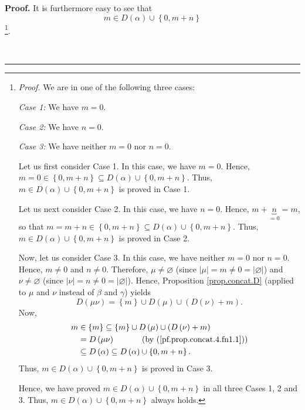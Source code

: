 \documentclass[numbers=enddot,12pt,final,onecolumn,notitlepage]{scrartcl}%
\theoremstyle{definition}
\newenvironment{proof}[1][Proof]{\noindent\textbf{#1.} }{\ \rule{0.5em}{0.5em}}
\begin{document}
\begin{proof}
It is furthermore easy to see that%
\[
m\in D\left(  \alpha\right)  \cup\left\{  0,m+n\right\}
\]
\footnote{\textit{Proof.} We are in one of the following three cases:
\par
\textit{Case 1:} We have $m=0$.
\par
\textit{Case 2:} We have $n=0$.
\par
\textit{Case 3:} We have neither $m=0$ nor $n=0$.
\par
Let us first consider Case 1. In this case, we have $m=0$. Hence,
$m=0\in\left\{  0,m+n\right\}  \subseteq D\left(  \alpha\right)  \cup\left\{
0,m+n\right\}  $. Thus, $m\in D\left(  \alpha\right)  \cup\left\{
0,m+n\right\}  $ is proved in Case 1.
\par
Let us next consider Case 2. In this case, we have $n=0$. Hence,
$m+\underbrace{n}_{=0}=m$, so that $m=m+n\in\left\{  0,m+n\right\}  \subseteq
D\left(  \alpha\right)  \cup\left\{  0,m+n\right\}  $. Thus, $m\in D\left(
\alpha\right)  \cup\left\{  0,m+n\right\}  $ is proved in Case 2.
\par
Now, let us consider Case 3. In this case, we have neither $m=0$ nor $n=0$.
Hence, $m\neq0$ and $n\neq0$. Therefore, $\mu\neq\varnothing$ (since
$\left\vert \mu\right\vert =m\neq0=\left\vert \varnothing\right\vert $) and
$\nu\neq\varnothing$ (since $\left\vert \nu\right\vert =n\neq0=\left\vert
\varnothing\right\vert $). Hence, Proposition \ref{prop.concat.D} (applied to
$\mu$ and $\nu$ instead of $\beta$ and $\gamma$) yields%
\begin{equation}
D\left(  \mu\nu\right)  =\left\{  m\right\}  \cup D\left(  \mu\right)
\cup\left(  D\left(  \nu\right)  +m\right)  . \label{pf.prop.concat.4.fn1.1}%
\end{equation}
Now,
\begin{align*}
m  &  \in\left\{  m\right\}  \subseteq\left\{  m\right\}  \cup D\left(
\mu\right)  \cup\left(  D\left(  \nu\right)  +m\right) \\
&  =D\left(  \mu\nu\right)  \ \ \ \ \ \ \ \ \ \ \left(  \text{by
(\ref{pf.prop.concat.4.fn1.1})}\right) \\
&  \subseteq D\left(  \alpha\right)  \subseteq D\left(  \alpha\right)
\cup\left\{  0,m+n\right\}  .
\end{align*}
Thus, $m\in D\left(  \alpha\right)  \cup\left\{  0,m+n\right\}  $ is proved in
Case 3.
\par
Hence, we have proved $m\in D\left(  \alpha\right)  \cup\left\{
0,m+n\right\}  $ in all three Cases 1, 2 and 3. Thus, $m\in D\left(
\alpha\right)  \cup\left\{  0,m+n\right\}  $ always holds.}.


\end{proof}
\end{document}
